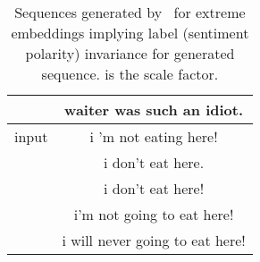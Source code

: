 \begin{table}[ht]
\begin{tabular}[t]{c|c}
\small &\small 	waiter was such an idiot. \\
\hline
\small input	&\small  i 'm not eating here! 	\\\hline
\small &	\small i don't eat here. 	\\
\small 	&\small i don't eat here! 	 \\
\small &\small 	i'm not going to eat here! 	 \\
\small &\small 	i will never going to eat here! \\
\hline
\end{tabular}
\caption{Sequences generated by \geneliex\ for extreme embeddings implying label (sentiment polarity) invariance for generated sequence.  is the scale factor.}
\label{tab:additional_example_sentences}
\end{table}

